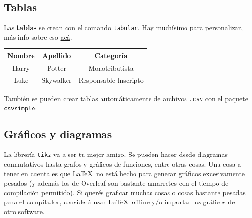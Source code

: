 \documentclass[12pt, spanish]{article}
\theoremstyle{definition} %
\theoremstyle{remark} %
\theoremstyle{plain} %
\theoremstyle{plain} %
\theoremstyle{plain} %
\theoremstyle{plain} %
\theoremstyle{plain} %
\theoremstyle{remark} %
\begin{document}
\lipsum[1] %

\subsection{Tablas}

Las \textbf{tablas} se crean con el comando \verb|tabular|. Hay muchísimo para personalizar, más info sobre eso \href{https://www.overleaf.com/learn/latex/Tables}{acá}.
\begin{center}
    \begin{tabular}{ ||c|c|c|| } 
     \hline
     Nombre & Apellido & Categoría \\ 
     \hline
     Harry & Potter & Monotributista \\ 
     Luke & Skywalker & Responsable Inscripto \\ 
     \hline
    \end{tabular}
\end{center}
También se pueden crear tablas automáticamente de archivos \verb|.csv| con el paquete \verb|csvsimple|:

\begin{center}
\end{center}

\subsection{Gráficos y diagramas}

La librería \verb|tikz| va a ser tu mejor amigo. Se pueden hacer desde diagramas conmutativos hasta grafos y gráficos de funciones, entre otras cosas. Una cosa a tener en cuenta es que \LaTeX\ no está hecho para generar gráficos excesivamente pesados (y además los de Overleaf son bastante amarretes con el tiempo de compilación permitido). Si querés graficar muchas cosas o cosas bastante pesadas para el compilador, considerá usar \LaTeX\ offline y/o importar los gráficos de otro software.
\end{document}
